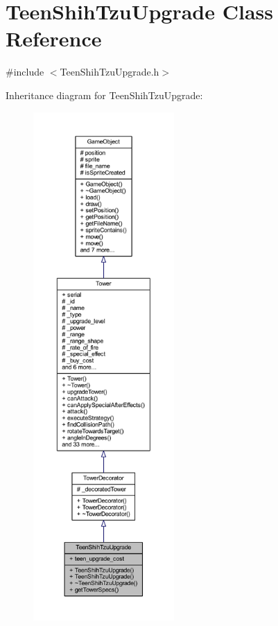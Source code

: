 \hypertarget{class_teen_shih_tzu_upgrade}{\section{Teen\+Shih\+Tzu\+Upgrade Class Reference}
\label{class_teen_shih_tzu_upgrade}
}


{\ttfamily \#include $<$Teen\+Shih\+Tzu\+Upgrade.\+h$>$}



Inheritance diagram for Teen\+Shih\+Tzu\+Upgrade\+:
\nopagebreak
\begin{figure}[H]
\begin{center}
\leavevmode
\includegraphics[height=550pt]{class_teen_shih_tzu_upgrade__inherit__graph}
\end{center}
\end{figure}


